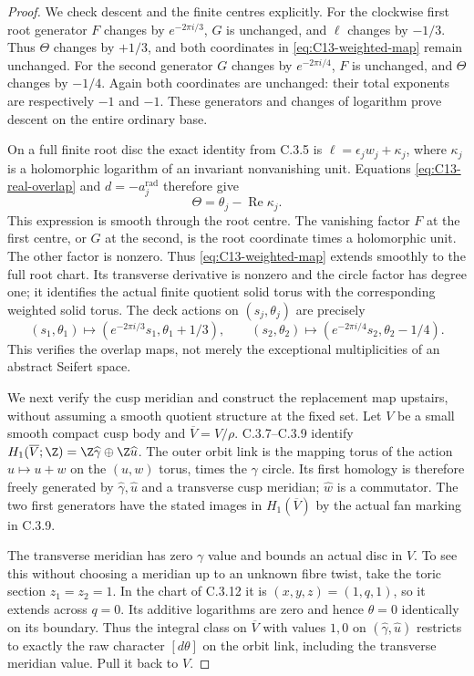 \begin{proof}
We check descent and the finite centres explicitly. For the
clockwise first root generator $F$ changes by $e^{-2\pi i/3}$,
$G$ is unchanged, and $\ell$ changes by $-1/3$.
Thus $\Theta$ changes by $+1/3$, and both coordinates in
\eqref{eq:C13-weighted-map} remain unchanged. For the second
generator $G$ changes by $e^{-2\pi i/4}$, $F$ is unchanged,
and $\Theta$ changes by $-1/4$. Again both coordinates are
unchanged: their total exponents are respectively $-1$ and
$-1$. These generators and changes of logarithm prove descent
on the entire ordinary base.

On a full finite root disc the exact identity from C.3.5 is
$\ell=\epsilon_jw_j+\kappa_j$, where $\kappa_j$ is a
holomorphic logarithm of an invariant nonvanishing unit.
Equations \eqref{eq:C13-real-overlap} and $d=-a_j^{\mathrm{rad}}$ therefore give
\[
 \Theta=\theta_j-\operatorname{Re}\kappa_j.
\]
This expression is smooth through the root centre. The vanishing
factor $F$ at the first centre, or $G$ at the second, is the
root coordinate times a holomorphic unit. The other factor is
nonzero. Thus \eqref{eq:C13-weighted-map} extends smoothly to
the full root chart. Its transverse derivative is nonzero and
the circle factor has degree one; it identifies the actual
finite quotient solid torus with the corresponding weighted
solid torus. The deck actions on $(s_j,\theta_j)$ are precisely
\[
 (s_1,\theta_1)\mapsto(e^{-2\pi i/3}s_1,\theta_1+1/3),
 \qquad
 (s_2,\theta_2)\mapsto(e^{-2\pi i/4}s_2,\theta_2-1/4).
\]
This verifies the overlap maps, not merely the exceptional
multiplicities of an abstract Seifert space.

We next verify the cusp meridian and construct the replacement
map upstairs, without assuming a smooth quotient structure at
the fixed set. Let $V$ be a small smooth compact cusp body and
$\overline V=V/\rho$. C.3.7--C.3.9 identify
$H_1(\overline V;\Z)=\Z\widehat\gamma\oplus\Z\widehat u$.
The outer orbit link is the mapping torus of the action
$u\mapsto u+w$ on the $(u,w)$ torus, times the $\gamma$ circle.
Its first homology is therefore freely generated by
$\widehat\gamma,\widehat u$ and a transverse cusp meridian;
$\widehat w$ is a commutator. The two first generators have
the stated images in $H_1(\overline V)$ by the actual fan marking
in C.3.9.

The transverse meridian has zero $\gamma$ value and bounds
an actual disc in $V$. To see this without choosing a meridian
up to an unknown fibre twist, take the toric section
$z_1=z_2=1$. In the chart of C.3.12 it is
$(x,y,z)=(1,q,1)$, so it extends across $q=0$.
Its additive logarithms are zero and hence $\theta=0$
identically on its boundary. Thus the integral class on
$\overline V$ with values $1,0$ on
$(\widehat\gamma,\widehat u)$ restricts to exactly the raw
character $[d\theta]$ on the orbit link, including the transverse
meridian value. Pull it back to $V$.


\end{proof}
